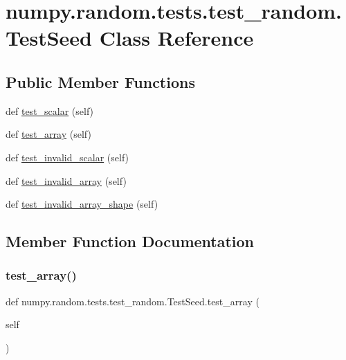 \hypertarget{classnumpy_1_1random_1_1tests_1_1test__random_1_1TestSeed}{}\section{numpy.\+random.\+tests.\+test\+\_\+random.\+Test\+Seed Class Reference}
\label{classnumpy_1_1random_1_1tests_1_1test__random_1_1TestSeed}
\subsection*{Public Member Functions}
\begin{DoxyCompactItemize}
\item 
def \hyperlink{classnumpy_1_1random_1_1tests_1_1test__random_1_1TestSeed_ae4e1a0e4bc2be9a8b679b6276bb428d9}{test\+\_\+scalar} (self)
\item 
def \hyperlink{classnumpy_1_1random_1_1tests_1_1test__random_1_1TestSeed_a556fc35ff67316e2079220debf7c9cd1}{test\+\_\+array} (self)
\item 
def \hyperlink{classnumpy_1_1random_1_1tests_1_1test__random_1_1TestSeed_aac3d176799f5b1e41d244233d54df4ad}{test\+\_\+invalid\+\_\+scalar} (self)
\item 
def \hyperlink{classnumpy_1_1random_1_1tests_1_1test__random_1_1TestSeed_a7d5728428ebffad4cb00ad585a76ac87}{test\+\_\+invalid\+\_\+array} (self)
\item 
def \hyperlink{classnumpy_1_1random_1_1tests_1_1test__random_1_1TestSeed_aa04f04f276503e8cf9f3890c1b277a32}{test\+\_\+invalid\+\_\+array\+\_\+shape} (self)
\end{DoxyCompactItemize}


\subsection{Member Function Documentation}
\mbox{\label{classnumpy_1_1random_1_1tests_1_1test__random_1_1TestSeed_a556fc35ff67316e2079220debf7c9cd1}} 
\subsubsection{\texorpdfstring{test\+\_\+array()}{test\_array()}}
{\footnotesize\ttfamily def numpy.\+random.\+tests.\+test\+\_\+random.\+Test\+Seed.\+test\+\_\+array (\begin{DoxyParamCaption}\item[{}]{self }\end{DoxyParamCaption})}

